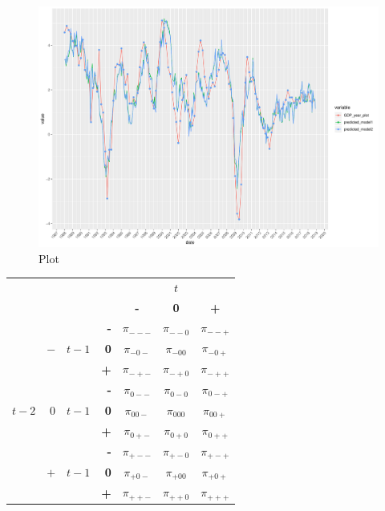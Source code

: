 \documentclass{article}[]
\begin{document}
\begin{figure}[H]
    \centering
    \includegraphics[scale=0.5]{Graphs/pred3.pdf}
    \caption{Plot }
    \label{pred3}
\end{figure}









\begin{center}
\begin{tabular}{r | r | r | r | c c c | }
 \multicolumn{3}{r}{} & \multicolumn{1}{r}{} &	\multicolumn{3}{c}{$t$} \\ \cline{5-7}
 \multicolumn{3}{r}{} & 		& \textbf{-} & \textbf{0} & \textbf{+} \\ \cline{2-2} \cline{4-7}
&&& \textbf{-} & $\pi_{---}$ & $\pi_{--0}$ & $\pi_{--+}$ \\ 
&  $-$ &$t-1$ & \textbf{0} & $\pi_{-0-}$	& $\pi_{-00}$ & $\pi_{-0+}$	\\
&&&\textbf{+} & $\pi_{-+-}$	& $\pi_{-+0}$	& $\pi_{-++}$ \\ \cline{2-2} \cline{4-7}
&&&\textbf{-} & $\pi_{0--}$	& $\pi_{0-0}$	& $\pi_{0-+}$ \\ 
$t-2$ & $0$   &$t-1$ & \textbf{0} & $\pi_{00-}$	& $\pi_{000}$	& $\pi_{00+}$	\\
&&&\textbf{+} & $\pi_{0+-}$	& $\pi_{0+0}$	& $\pi_{0++}$ \\ \cline{2-2} \cline{4-7}
&&&\textbf{-} & $\pi_{+--}$	& $\pi_{+-0}$	& $\pi_{+-+}$ \\ 
&$+$   &$t-1$ & \textbf{0} & $\pi_{+0-}$	& $\pi_{+00}$	& $\pi_{+0+}$	\\
&&&\textbf{+} & $\pi_{++-}$	& $\pi_{++0}$	& $\pi_{+++}$ \\ \cline{2-2} \cline{4-7}
		
\end{tabular}    
\end{center}
\end{document}
